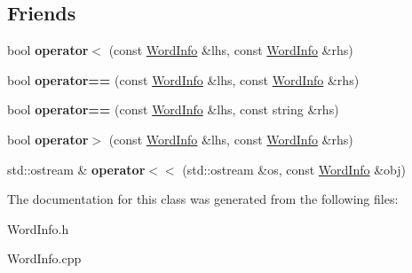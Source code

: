 \subsection*{Friends}
\begin{DoxyCompactItemize}
\item 
\hypertarget{class_word_info_a4c30cf1518b558337253b945ccd521d2}{bool {\bfseries operator$<$} (const \hyperlink{class_word_info}{Word\+Info} \&lhs, const \hyperlink{class_word_info}{Word\+Info} \&rhs)}\label{class_word_info_a4c30cf1518b558337253b945ccd521d2}

\item 
\hypertarget{class_word_info_a4bf92b0be09436e748a36f358f84d734}{bool {\bfseries operator==} (const \hyperlink{class_word_info}{Word\+Info} \&lhs, const \hyperlink{class_word_info}{Word\+Info} \&rhs)}\label{class_word_info_a4bf92b0be09436e748a36f358f84d734}

\item 
\hypertarget{class_word_info_ad5be93424e25e9468002e7514be32363}{bool {\bfseries operator==} (const \hyperlink{class_word_info}{Word\+Info} \&lhs, const string \&rhs)}\label{class_word_info_ad5be93424e25e9468002e7514be32363}

\item 
\hypertarget{class_word_info_aba1f3f7387dd5574e1e9c787943c75e9}{bool {\bfseries operator$>$} (const \hyperlink{class_word_info}{Word\+Info} \&lhs, const \hyperlink{class_word_info}{Word\+Info} \&rhs)}\label{class_word_info_aba1f3f7387dd5574e1e9c787943c75e9}

\item 
\hypertarget{class_word_info_accc174cc916eae2e7e7016522097976d}{std\+::ostream \& {\bfseries operator$<$$<$} (std\+::ostream \&os, const \hyperlink{class_word_info}{Word\+Info} \&obj)}\label{class_word_info_accc174cc916eae2e7e7016522097976d}

\end{DoxyCompactItemize}


The documentation for this class was generated from the following files\+:\begin{DoxyCompactItemize}
\item 
Word\+Info.\+h\item 
Word\+Info.\+cpp\end{DoxyCompactItemize}
